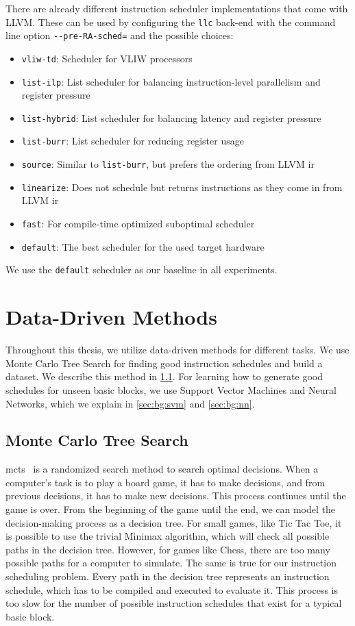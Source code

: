 There are already different instruction scheduler implementations that come with LLVM.
These can be used by configuring the \lstinline|llc| back-end with the command line option \lstinline|--pre-RA-sched=| and the possible choices:
\begin{itemize}
    \item \lstinline|vliw-td|: Scheduler for VLIW processors
    \item \lstinline|list-ilp|: List scheduler for balancing instruction-level parallelism and register pressure
    \item \lstinline|list-hybrid|: List scheduler for balancing latency and register pressure
    \item \lstinline|list-burr|: List scheduler for reducing register usage
    \item \lstinline|source|: Similar to \lstinline|list-burr|, but prefers the ordering from LLVM \ac{ir}
    \item \lstinline|linearize|: Does not schedule but returns instructions as they come in from LLVM \ac{ir}
    \item \lstinline|fast|: For compile-time optimized suboptimal scheduler
    \item \lstinline|default|: The best scheduler for the used target hardware
\end{itemize}
We use the \lstinline|default| scheduler as our baseline in all experiments.


\section{Data-Driven Methods}
\label{sec:bg:ml}
Throughout this thesis, we utilize data-driven methods for different tasks.
We use Monte Carlo Tree Search for finding good instruction schedules and build a dataset.
We describe this method in \cref{sec:bg:mcts}.
For learning how to generate good schedules for unseen basic blocks, we use Support Vector Machines and Neural Networks, which we explain in \cref{sec:bg:svm} and \cref{sec:bg:nn}.

\subsection{Monte Carlo Tree Search}
\label{sec:bg:mcts}
\ac{mcts}~\cite{abramson1990expected} is a randomized search method to search optimal decisions.
When a computer's task is to play a board game, it has to make decisions, and from previous decisions, it has to make new decisions.
This process continues until the game is over.
From the beginning of the game until the end, we can model the decision-making process as a decision tree.
For small games, like Tic Tac Toe, it is possible to use the trivial Minimax algorithm, which will check all possible paths in the decision tree.
However, for games like Chess, there are too many possible paths for a computer to simulate.
The same is true for our instruction scheduling problem.
Every path in the decision tree represents an instruction schedule, which has to be compiled and executed to evaluate it.
This process is too slow for the number of possible instruction schedules that exist for a typical basic block.

